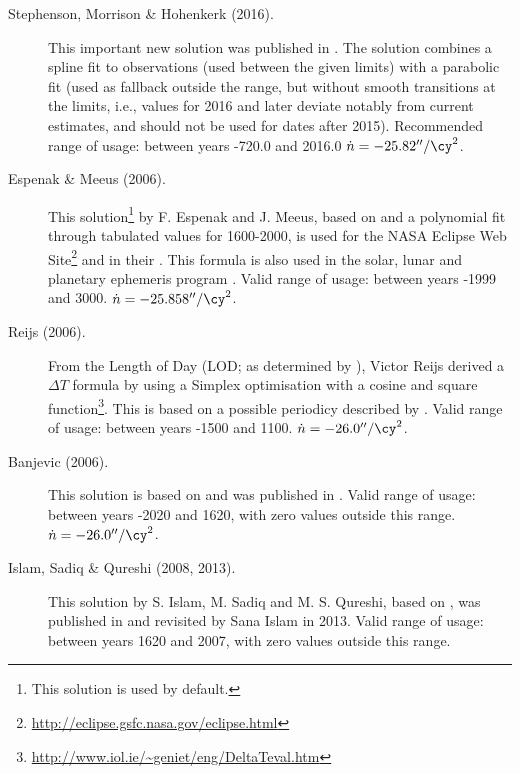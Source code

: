 \begin{description}
\item[Stephenson, Morrison \& Hohenkerk (2016).] This important new solution was published 
  in . 
  The solution combines a spline fit to observations (used between the given limits) 
  with a parabolic fit (used as fallback outside the range, but without smooth transitions at the limits, i.e., 
  values for 2016 and later deviate notably from current estimates, and should not be used for dates after 2015).
  Recommended range of usage: between years -720.0 and 2016.0 $\dot{n}=-25.82''/\cy^2$.
  
\item[Espenak \& Meeus (2006).] This solution\footnote{This solution
    is used by default.} by F. Espenak and J. Meeus, based on 
	\citet{2004JHA....35..327M} and a polynomial fit
  through tabulated values for 1600-2000, is used for the NASA Eclipse
  Web Site\footnote{\url{http://eclipse.gsfc.nasa.gov/eclipse.html}}
  and in their . This formula is also used in the
  solar, lunar and planetary ephemeris program . Valid
  range of usage: between years -1999 and
  3000. $\dot{n}=-25.858''/\cy^2$.

\item[Reijs (2006).] From the Length of Day (LOD; as determined by
  \citet{2004JHA....35..327M}), Victor Reijs
  derived a $\Delta T$ formula by using a Simplex optimisation with a
  cosine and square
  function\footnote{\url{http://www.iol.ie/~geniet/eng/DeltaTeval.htm}}. This
  is based on a possible periodicy described by
  \citet{2004JHA....35..327M}. Valid range of usage: between
  years -1500 and 1100. $\dot{n}=-26.0''/\cy^2$.

\item[Banjevic (2006).] This solution is based on
  \citet{1984RSPTA.313...47S} and was
  published in . Valid range of usage: between
  years -2020 and 1620, with zero values outside this range. 
  $\dot{n}=-26.0''/\cy^2$.

\item[Islam, Sadiq \& Qureshi (2008, 2013).] This solution by
  S. Islam, M. Sadiq and M. S. Qureshi, based on \citet{2000JBAA..110..323M}, was published in 
   and revisited by Sana Islam
  in 2013. Valid range of usage: between years 1620 and 2007, with
  zero values outside this range.


\end{description}
